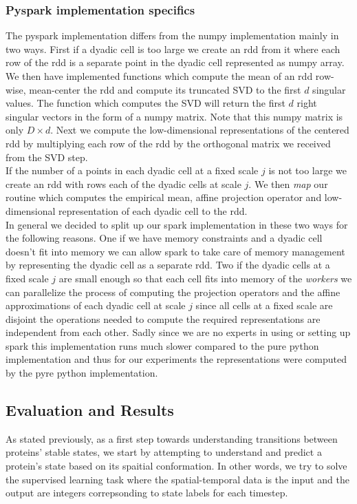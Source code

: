 \documentclass{article}
\begin{document}
  \subsubsection{Pyspark implementation specifics}
  The pyspark implementation differs from the numpy implementation mainly in two ways. First if a dyadic cell is too large we create an rdd from it where each row of the rdd is a separate point in the dyadic cell represented as numpy array. We then have implemented functions which compute the mean of an rdd row-wise, mean-center the rdd and compute its truncated SVD to the first $d$ singular values. The function which computes the SVD will return the first $d$ right singular vectors in the form of a numpy matrix. Note that this numpy matrix is only $D\times d$. Next we compute the low-dimensional representations of the centered rdd by multiplying each row of the rdd by the orthogonal matrix we received from the SVD step.\\
  If the number of a points in each dyadic cell at a fixed scale $j$ is not too large we create an rdd with rows each of the dyadic cells at scale $j$. We then \textit{map} our routine which computes the empirical mean, affine projection operator and low-dimensional representation of each dyadic cell to the rdd.\\
  In general we decided to split up our spark implementation in these two ways for the following reasons. One if we have memory constraints and a dyadic cell doesn't fit into memory we can allow spark to take care of memory management by representing the dyadic cell as a separate rdd. Two if the dyadic cells at a fixed scale $j$ are small enough so that each cell fits into memory of the \textit{workers} we can parallelize the process of computing the projection operators and the affine approximations of each dyadic cell at scale $j$ since all cells at a fixed scale are disjoint the operations needed to compute the required representations are independent from each other. Sadly since we are no experts in using or setting up spark this implementation runs much slower compared to the pure python implementation and thus for our experiments the representations were computed by the pyre python implementation.

\subsection{Evaluation and Results}

	As stated previously, as a first step towards understanding transitions between proteins' stable states, we start by attempting to understand and predict a protein's state based on its spaitial conformation. In other words, we try to solve the supervised learning task where the spatial-temporal data is the input and the output are integers correpsonding to state labels for each timestep.
	
\end{document}

